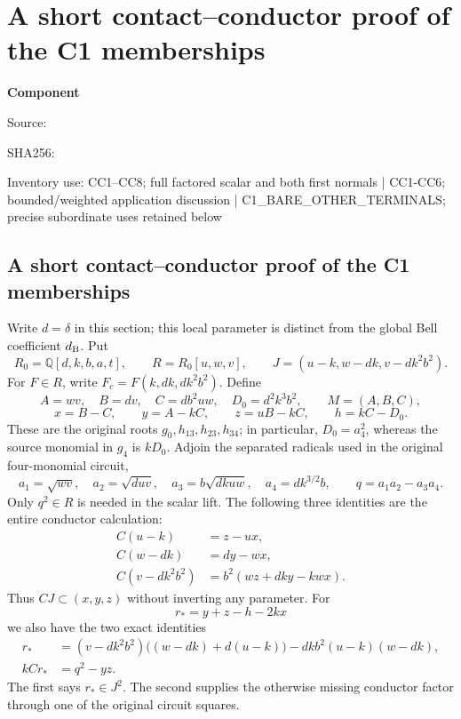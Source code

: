 \chapter{A short contact--conductor proof of the C1 memberships}
\label{component:pfabc29e28ab3}
\noindent\textbf{Component }\par
{\small\noindent Source: \par}
{\small\noindent SHA256: \par}
{\small\noindent Inventory use: CC1--CC8; full factored scalar and both first normals | CC1-CC6; bounded/weighted application discussion | C1\_\allowbreak{}BARE\_\allowbreak{}OTHER\_\allowbreak{}TERMINALS; precise subordinate uses retained below\par}
\medskip
\section{A short contact--conductor proof of the C1 memberships}

Write $d=\delta$ in this section; this local parameter is distinct from
the global Bell coefficient $d_{\rm B}$. Put
\[
 R_0=\mathbb Q[d,k,b,a,t],\qquad R=R_0[u,w,v],\qquad
 J=(u-k,w-dk,v-dk^2b^2).
\]
For $F\in R$, write $F_c=F(k,dk,dk^2b^2)$. Define
\[
 A=wv,\quad B=dv,\quad C=db^2uw,\quad D_0=d^2k^3b^2,
 \qquad M=(A,B,C),
\]
\[
 x=B-C,\qquad y=A-kC,\qquad z=uB-kC,\qquad h=kC-D_0.
\]
These are the original roots $g_0,h_{13},h_{23},h_{34}$; in particular,
$D_0=a_4^2$, whereas the source monomial in $g_4$ is $kD_0$.
Adjoin the separated radicals used in the original four-monomial circuit,
\[
 a_1=\sqrt{wv},\quad a_2=\sqrt{duv},\quad
 a_3=b\sqrt{dkuw},\quad a_4=dk^{3/2}b,
 \qquad q=a_1a_2-a_3a_4.
\]
Only $q^2\in R$ is needed in the scalar lift. The following three identities
are the entire conductor calculation:
\begin{align}
 C(u-k)&=z-ux,\label{pfabc29e28ab3:CC-u}\\
 C(w-dk)&=dy-wx,\label{pfabc29e28ab3:CC-w}\\
 C(v-dk^2b^2)&=b^2(wz+dky-kwx).\label{pfabc29e28ab3:CC-v}
\end{align}
Thus $CJ\subset(x,y,z)$ without inverting any parameter.
For
\[
 r_*=y+z-h-2kx
\]
we also have the two exact identities
\begin{align}
 r_*&=(v-dk^2b^2)\bigl((w-dk)+d(u-k)\bigr)
       -dkb^2(u-k)(w-dk),\label{pfabc29e28ab3:CC-star}\\
 kCr_*&=q^2-yz.\label{pfabc29e28ab3:CC-repair}
\end{align}
The first says $r_*\in J^2$. The second supplies the otherwise missing
conductor factor through one of the original circuit squares.

